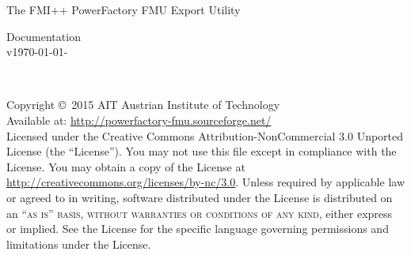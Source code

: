 \documentclass[11pt,fleqn,oneside,openany]{book} %
\newcommand{\versionsep}{-}
\newcommand{\fmipp}{FMI++\xspace}
\newcommand{\pf}{PowerFactory\xspace}
\begin{document}

\begingroup
\thispagestyle{empty}
\centering
\vspace*{9.35cm}
\par\normalfont\fontsize{29}{30}\sffamily\selectfont
The \fmipp \pf FMU Export Utility\par %
\vspace*{0.5cm}
{\huge Documentation}\\[5pt]
{\normalsize v\yyyymmdddate\today\versionsep\currenttime}\par %
\endgroup


\newpage
~\vfill
\thispagestyle{empty}

\noindent Copyright \copyright\ 2015 AIT Austrian Institute of Technology\\ %


\noindent Available at: \url{http://powerfactory-fmu.sourceforge.net/}\\ %

\noindent Licensed under the Creative Commons Attribution-NonCommercial 3.0 Unported License (the ``License''). You may not use this file except in compliance with the License. You may obtain a copy of the License at \url{http://creativecommons.org/licenses/by-nc/3.0}. Unless required by applicable law or agreed to in writing, software distributed under the License is distributed on an \textsc{``as is'' basis, without warranties or conditions of any kind}, either express or implied. See the License for the specific language governing permissions and limitations under the License.\\ %


\end{document}
